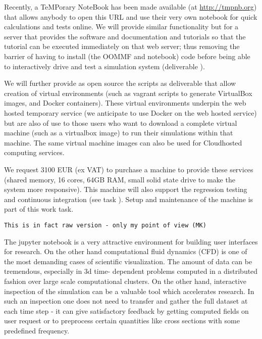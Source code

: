 \begin{workpackage}
\begin{tasklist}
\begin{task}[id=oommf-nb-ve,title=\OOMMFNB{} online and downloadable virtual environments]
  Recently, a TeMPorary \Jupyter NoteBook has been made available (at
  \href{http://tmpnb.org}{http://tmpnb.org}) that allows anybody to
  open this URL and use their very own \Jupyter notebook for quick
  calculations and tests online. We will provide similar functionality
  but for a server that provides the \OOMMFNB{} software and \OOMMFNB{}
  documentation and tutorials so that the tutorial can be executed
  immediately on that web server; thus removing the barrier of having
  to install (the OOMMF and \Jupyter notebook) code before being able to interactively drive and test a
  simulation system (deliverable ).

  We will further provide as open source the scripts as deliverable
   that allow
  creation of virtual environments (such as vagrant scripts to
  generate VirtualBox \cite{Virtualbox} images, and Docker
  \cite{Docker} containers). These virtual environments underpin the
  web hosted temporary \OOMMFNB{} service (we anticipate to use Docker
  on the web hosted service) but are also of use to those users who
  want to download a complete virtual machine (such as a virtualbox
  image) to run their simulations within that machine. The same
  virtual machine images can also be used for Cloudhosted computing services.

  We request 3100 EUR (ex VAT) to purchase a machine to provide these
  services (shared memory, 16 cores, 64GB RAM, small solid state drive
  to make the system more responsive). This machine will also support
  the regression testing and continuous integration (see task
  ). Setup and
  maintenance of the machine is part of this work task.
\end{task}


\begin{task}[title=Visualization system for fluid dynamics data in  web-notebook
, id=cfd-vis]

\begin{verbatim}
This is in fact raw version - only my point of view (MK)
\end{verbatim}

The jupyter notebook is a very attractive environment for building
user interfaces for research. On the other hand computational fluid
dynamics (CFD) is one of the most demanding cases of scientific
visualization. The amount of data can be tremendous, especially in 3d
time- dependent problems computed in a distributed fashion over large
scale computational clusters. On the other hand, interactive
inspection of the simulation can be a valuable tool which accelerates
research. In such an inspection one does not need to transfer and
gather the full dataset at each time step - it can give satisfactory
feedback by getting computed fields on user request or to preprocess
certain quantities like cross sections with some predefined frequency.


\end{task}
\end{tasklist}
\end{workpackage}
